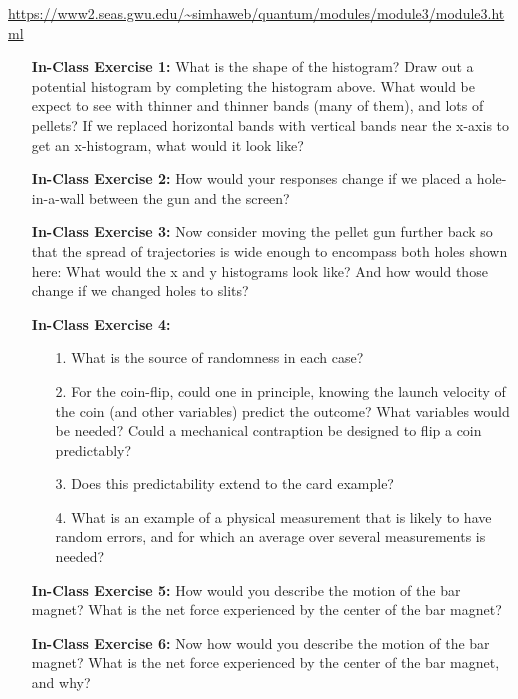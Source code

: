 \documentclass[main.tex]{subfiles}
\begin{document}
\url{https://www2.seas.gwu.edu/~simhaweb/quantum/modules/module3/module3.html}

\begin{enumerate}

\item[] \textbf{In-Class Exercise 1:}  What is the shape of the histogram? Draw out a potential histogram by completing the histogram above. What would be expect to see with thinner and thinner bands (many of them), and lots of pellets? If we replaced horizontal bands with vertical bands near the x-axis to get an x-histogram, what would it look like? 

\item[] \textbf{In-Class Exercise 2:} How would your responses change if we placed a hole-in-a-wall between the gun and the screen?

\item[] \textbf{In-Class Exercise 3:} Now consider moving the pellet gun further back so that the spread of trajectories is wide enough to encompass both holes shown here: What would the x and y histograms look like? And how would those change if we changed holes to slits?

\item[] \textbf{In-Class Exercise 4:}

    \begin{enumerate}
        \item[1.] What is the source of randomness in each case?
        \item[2.] For the coin-flip, could one in principle, knowing the launch velocity of the coin (and other variables) predict the outcome? What variables would be needed? Could a mechanical contraption be designed to flip a coin predictably?
        \item[3.] Does this predictability extend to the card example?
        \item[4.] What is an example of a physical measurement that is likely to have random errors, and for which an average over several measurements is needed?
    \end{enumerate}

\item[] \textbf{In-Class Exercise 5:} How would you describe the motion of the bar magnet? What is the net force experienced by the center of the bar magnet?

\item[] \textbf{In-Class Exercise 6:} Now how would you describe the motion of the bar magnet? What is the net force experienced by the center of the bar magnet, and why?


\end{enumerate}
\end{document}
